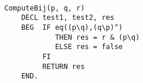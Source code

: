 \begin{program}
\label{prog:compute_bij}~
	\begin{lstlisting}
		ComputeBij(p, q, r)
		    DECL test1, test2, res
		    BEG  IF eq((p\q),(q\p)^)
		            THEN res = r & (p\q)
		            ELSE res = false 
		         FI       
		         RETURN res
		    END.		
	\end{lstlisting}
\end{program}